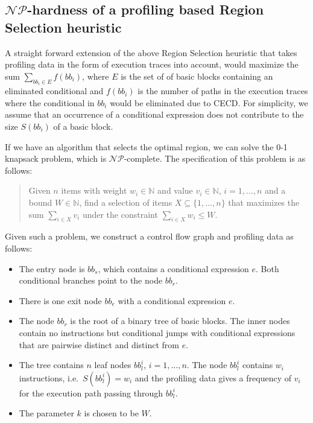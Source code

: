 \documentclass[halfparskip]{scrartcl}
\begin{document}
\subsection{$\mathcal{NP}$-hardness of a profiling based Region Selection heuristic}

A straight forward extension of the above Region Selection heuristic that takes profiling data in the form of execution traces into account, would maximize the sum $\sum_{bb_i\in E} f(bb_i)$, where $E$ is the set of of basic blocks containing an eliminated conditional and $f(bb_i)$ is the number of paths in the execution traces where the conditional in $bb_i$ would be eliminated due to CECD. For simplicity, we assume that an occurrence of a conditional expression does not contribute to the size $S(bb_i)$ of a basic block.

If we have an algorithm that selects the optimal region, we can solve the 0-1 knapsack problem, which is $\mathcal{NP}$-complete. The specification of this problem is as follows:
\begin{quote}
Given $n$ items with weight $w_i\in \mathbb N$ and value $v_i\in \mathbb N$, $i=1,\ldots,n$ and a bound $W\in\mathbb N$, find a selection of items $X \subseteq \{1,\ldots,n\}$ that maximizes the sum $\sum_{i\in X} v_i$ under the constraint $\sum_{i\in X} w_i \le W$.
\end{quote}
Given such a problem, we construct a control flow graph and profiling data as follows:
\begin{itemize}
\item The entry node is $bb_s$, which contains a conditional expression $e$. Both conditional branches point to the node $bb_r$.
\item There is one exit node $bb_e$ with a conditional expression $e$.
\item The node $bb_r$ is the root of a binary tree of basic blocks. The inner nodes contain no instructions but conditional jumps with conditional expressions that are pairwise distinct and distinct from $e$.
\item The tree contains $n$ leaf nodes $bb_l^i$, $i=1,\ldots,n$. The node $bb_l^i$ contains $w_i$ instructions, i.e.\ $S(bb_l^i)=w_i$ and the profiling data gives a frequency of $v_i$ for the execution path passing through $bb_l^i$.
\item The parameter $k$ is chosen to be $W$.
\end{itemize}
\end{document}
